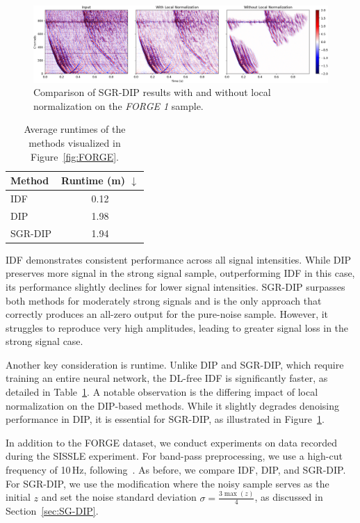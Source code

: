 \begin{figure}
    \centering
    \includegraphics[width=\textwidth]{img/fig_6.5.png}
    \caption{
        Comparison of SGR-DIP results with and without local normalization on the \textit{FORGE 1} sample.
    }\label{fig:local-normalization}
\end{figure}

\begin{table}
    \centering
    \begin{tabular}{ l c }
        \toprule
        Method &Runtime (m) $\downarrow$\\
        \midrule
        IDF &0.12\\
        DIP &1.98\\
        SGR-DIP &1.94\\
        \bottomrule
    \end{tabular}
    \caption{Average runtimes of the methods visualized in Figure~\ref{fig:FORGE}.}\label{tab:runtimes}
\end{table}

IDF demonstrates consistent performance across all signal intensities.
While DIP preserves more signal in the strong signal sample, outperforming IDF in this case, its performance slightly declines for lower signal intensities.
SGR-DIP surpasses both methods for moderately strong signals and is the only approach that correctly produces an all-zero output for the pure-noise sample.
However, it struggles to reproduce very high amplitudes, leading to greater signal loss in the strong signal case.

Another key consideration is runtime.
Unlike DIP and SGR-DIP, which require training an entire neural network, the DL-free IDF is significantly faster, as detailed in Table~\ref{tab:runtimes}.
A notable observation is the differing impact of local normalization on the DIP-based methods. 
While it slightly degrades denoising performance in DIP, it is essential for SGR-DIP, as illustrated in Figure~\ref{fig:local-normalization}.

In addition to the FORGE dataset, we conduct experiments on data recorded during the SISSLE experiment.
For band-pass preprocessing, we use a high-cut frequency of 10\,Hz, following~\cite{DAS-CN2S}.
As before, we compare IDF, DIP, and SGR-DIP\@.
For SGR-DIP, we use the modification where the noisy sample serves as the initial $z$ and set the noise standard deviation $\sigma = \frac{3\max(z)}{4}$, as discussed in Section~\ref{sec:SG-DIP}.

